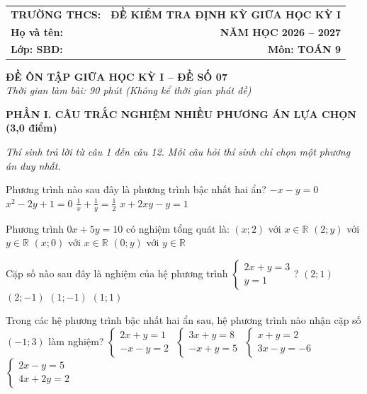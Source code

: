 \documentclass[12pt,a4paper]{article}
\begin{document}
\noindent
\begin{tabularx}{\linewidth}{X r}
\textbf{TRƯỜNG THCS: \dotfill} & \textbf{ĐỀ KIỂM TRA ĐỊNH KỲ GIỮA HỌC KỲ I} \\
\textbf{Họ và tên: \dotfill} & \textbf{NĂM HỌC 2026 -- 2027} \\
\textbf{Lớp: \dotfill \quad SBD: \dotfill} & \textbf{Môn: TOÁN 9} \\
\hline
\end{tabularx}
\vspace{2mm}

\begin{center}
  \textbf{\large ĐỀ ÔN TẬP GIỮA HỌC KỲ I -- ĐỀ SỐ 07}\\
  \textit{Thời gian làm bài: 90 phút (Không kể thời gian phát đề)}
\end{center}
\vspace{1mm}

\noindent\textbf{\large PHẦN I. CÂU TRẮC NGHIỆM NHIỀU PHƯƠNG ÁN LỰA CHỌN (3,0 điểm)}

\textit{Thí sinh trả lời từ câu 1 đến câu 12. Mỗi câu hỏi thí sinh chỉ chọn một phương án duy nhất.}

\vspace{1mm}
\begin{ex}
Phương trình nào sau đây là phương trình bậc nhất hai ẩn?
\choice
{\True $-x - y = 0$}
{$x^2 - 2y + 1 = 0$}
{$\frac{1}{x} + \frac{1}{y} = \frac{1}{2}$}
{$x + 2xy - y = 1$}
\end{ex}

\begin{ex}
Phương trình $0x + 5y = 10$ có nghiệm tổng quát là:
\choice
{\True $(x; 2)$ với $x \in \mathbb{R}$}
{$(2; y)$ với $y \in \mathbb{R}$}
{$(x; 0)$ với $x \in \mathbb{R}$}
{$(0; y)$ với $y \in \mathbb{R}$}
\end{ex}

\begin{ex}
Cặp số nào sau đây là nghiệm của hệ phương trình $\begin{cases} 2x + y = 3 \\ y = 1 \end{cases}$?
\choice
{$(2; 1)$}
{$(2; -1)$}
{$(1; -1)$}
{\True $(1; 1)$}
\end{ex}

\begin{ex}
Trong các hệ phương trình bậc nhất hai ẩn sau, hệ phương trình nào nhận cặp số $(-1; 3)$ làm nghiệm?
\choice
{$\begin{cases} 2x + y = 1 \\ -x - y = 2 \end{cases}$}
{$\begin{cases} 3x + y = 8 \\ -x + y = 5 \end{cases}$}
{\True $\begin{cases} x + y = 2 \\ 3x - y = -6 \end{cases}$}
{$\begin{cases} 2x - y = 5 \\ 4x + 2y = 2 \end{cases}$}
\end{ex}
\end{document}
